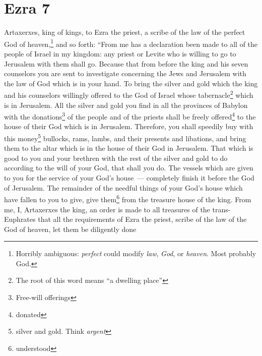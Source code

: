 \section{Ezra 7}\label{Ezra 7}
\begin{enumerate}[align=center]
     Artaxerxes, king of kings, to Ezra the priest, a scribe of the law of the perfect God of heaven,\footnote{Horribly ambiguous: \emph{perfect} could modify \emph{law}, \emph{God}, or \emph{heaven}. Most probably God.} and so forth:%
     ``From me has a declaration been made to all of the people of Israel in my kingdom: any priest or Levite who is willing to go to Jerusalem with them shall go.%
     Because that from before the king and his seven counselors you are sent to investigate concerning the Jews and Jerusalem with the law of God which is in your hand.%
     To bring the silver and gold which the king and his counselors willingly offered to the God of Israel whose tabernacle\footnote{The root of this word means ``a dwelling place''} which is in Jerusalem.%
     All the silver and gold you find in all the provinces of Babylon with the donations\footnote{Free-will offerings} of the people and of the priests shall be freely offered\footnote{donated} to the house of their God which is in Jerusalem.%
     Therefore, you shall speedily buy with this money\footnote{silver and gold. Think \emph{argent}} bullocks, rams, lambs, and their presents and libations, and bring them to the altar which is in the house of their God in Jerusalem.%
     That which is good to you and your brethren with the rest of the silver and gold to do according to the will of your God, that shall you do.%
     The vessels which are given to you for the service of your God's house~--- completely finish it before the God of Jerusalem.%
     The remainder of the needful things of your God's house which have fallen to you to give, give them\footnote{understood} from the treasure house of the king.%
     From me, I, Artaxerxes the king, an order is made to all treasures of the trans-Euphrates that all the requirements of Ezra the priest, scribe of the law of the God of heaven, let them be diligently done%

\end{enumerate}
